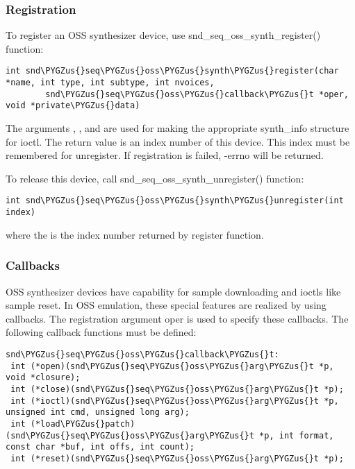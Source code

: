 \documentclass[a4paper,8pt,english]{sphinxmanual}
\def\PYGZus{\char`\_}
\begin{document}
\subsubsection{Registration}
\label{sound/designs/seq-oss:registration}
To register an OSS synthesizer device, use snd\_seq\_oss\_synth\_register()
function:

\begin{Verbatim}[commandchars=\\\{\}]
int snd\PYGZus{}seq\PYGZus{}oss\PYGZus{}synth\PYGZus{}register(char *name, int type, int subtype, int nvoices,
        snd\PYGZus{}seq\PYGZus{}oss\PYGZus{}callback\PYGZus{}t *oper, void *private\PYGZus{}data)
\end{Verbatim}

The arguments , ,  and 
are used for making the appropriate synth\_info structure for ioctl. The
return value is an index number of this device. This index must be remembered
for unregister. If registration is failed, -errno will be returned.

To release this device, call snd\_seq\_oss\_synth\_unregister() function:

\begin{Verbatim}[commandchars=\\\{\}]
int snd\PYGZus{}seq\PYGZus{}oss\PYGZus{}synth\PYGZus{}unregister(int index)
\end{Verbatim}

where the  is the index number returned by register function.


\subsubsection{Callbacks}
\label{sound/designs/seq-oss:callbacks}
OSS synthesizer devices have capability for sample downloading and ioctls
like sample reset. In OSS emulation, these special features are realized
by using callbacks. The registration argument oper is used to specify these
callbacks. The following callback functions must be defined:

\begin{Verbatim}[commandchars=\\\{\}]
snd\PYGZus{}seq\PYGZus{}oss\PYGZus{}callback\PYGZus{}t:
 int (*open)(snd\PYGZus{}seq\PYGZus{}oss\PYGZus{}arg\PYGZus{}t *p, void *closure);
 int (*close)(snd\PYGZus{}seq\PYGZus{}oss\PYGZus{}arg\PYGZus{}t *p);
 int (*ioctl)(snd\PYGZus{}seq\PYGZus{}oss\PYGZus{}arg\PYGZus{}t *p, unsigned int cmd, unsigned long arg);
 int (*load\PYGZus{}patch)(snd\PYGZus{}seq\PYGZus{}oss\PYGZus{}arg\PYGZus{}t *p, int format, const char *buf, int offs, int count);
 int (*reset)(snd\PYGZus{}seq\PYGZus{}oss\PYGZus{}arg\PYGZus{}t *p);
\end{Verbatim}
\end{document}
